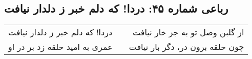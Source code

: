 \begin{center}
\section*{رباعی شماره ۴۵: دردا! که دلم خبر ز دلدار نیافت}
\label{sec:045}
\begin{longtable}{l p{0.5cm} r}
دردا! که دلم خبر ز دلدار نیافت
&&
از گلبن وصل تو به جز خار نیافت
\\
عمری به امید حلقه زد بر در او
&&
چون حلقه برون در، دگر بار نیافت
\\
\end{longtable}
\end{center}

